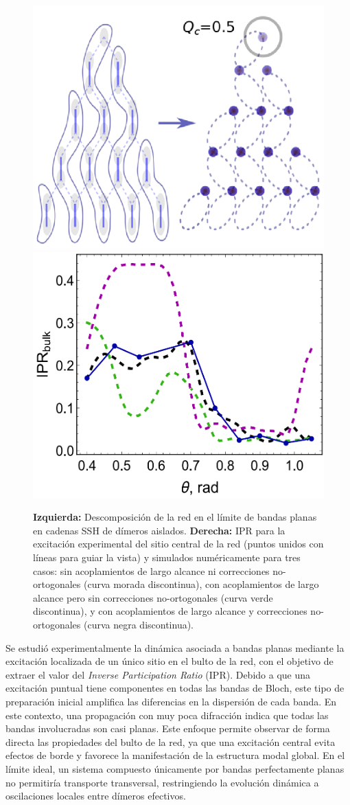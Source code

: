 \begin{figure}[H]
	\centering
	\includegraphics[width=0.40\linewidth]{media/cuasi-ssh.png}
	\hfill
	\includegraphics[width=0.40\linewidth]{media/ipr-bulk-exp.png}
	\caption[Descomposición de la red en cadenas cuasi-SSH]{  
		\textbf{Izquierda: }  
		Descomposición de la red en el límite de bandas planas en cadenas SSH de dímeros aislados. \textbf{Derecha: }  IPR para la excitación experimental del sitio central de la red (puntos unidos con líneas para guiar la vista) y simulados numéricamente para tres casos: sin acoplamientos de largo alcance ni correcciones no-ortogonales (curva morada discontinua), con acoplamientos de largo alcance pero sin correcciones no-ortogonales (curva verde discontinua), y con acoplamientos de largo alcance y correcciones no-ortogonales (curva negra discontinua).  \label{fig:cuasi-ssh}}
\end{figure} \vspace{-2ex}
Se estudió experimentalmente la dinámica asociada a bandas planas mediante la excitación localizada de un único sitio en el bulto de la red, con el objetivo de extraer el valor del \textit{Inverse Participation Ratio} (IPR). Debido a que una excitación puntual tiene componentes en todas las bandas de Bloch, este tipo de preparación inicial amplifica las diferencias en la dispersión de cada banda. En este contexto, una propagación con muy poca difracción indica que todas las bandas involucradas son casi planas. Este enfoque permite observar de forma directa las propiedades del bulto de la red, ya que una excitación central evita efectos de borde y favorece la manifestación de la estructura modal global. En el límite ideal, un sistema compuesto únicamente por bandas perfectamente planas no permitiría transporte transversal, restringiendo la evolución dinámica a oscilaciones locales entre dímeros efectivos.

